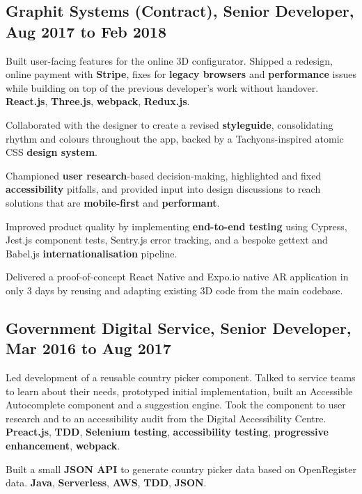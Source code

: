 \documentclass{article}
\begin{document}
\subsection*{Graphit Systems (Contract), Senior Developer, Aug 2017 to Feb 2018}

Built user-facing features for the online 3D configurator. Shipped a redesign,
online payment with \textbf{Stripe}, fixes for \textbf{legacy browsers} and
\textbf{performance} issues while building on top of the previous developer's
work without handover. \textbf{React.js}, \textbf{Three.js}, \textbf{webpack},
\textbf{Redux.js}.

Collaborated with the designer to create a revised \textbf{styleguide},
consolidating rhythm and colours throughout the app, backed by a
Tachyons-inspired atomic CSS \textbf{design system}.

Championed \textbf{user research}-based decision-making, highlighted and fixed
\textbf{accessibility} pitfalls, and provided input into design discussions to
reach solutions that are \textbf{mobile-first} and \textbf{performant}.

Improved product quality by implementing \textbf{end-to-end testing} using
Cypress, Jest.js component tests, Sentry.js error tracking, and a bespoke
gettext and Babel.js \textbf{internationalisation} pipeline.

Delivered a proof-of-concept React Native and Expo.io native AR application in
only 3 days by reusing and adapting existing 3D code from the main codebase.

\subsection*{Government Digital Service, Senior Developer, Mar 2016 to Aug 2017}

Led development of a reusable country picker component. Talked to service teams
to learn about their needs, prototyped initial implementation, built an
Accessible Autocomplete component and a suggestion engine. Took the component to
user research and to an accessibility audit from the Digital Accessibility
Centre. \textbf{Preact.js}, \textbf{TDD}, \textbf{Selenium testing},
\textbf{accessibility testing}, \textbf{progressive enhancement},
\textbf{webpack}.

Built a small \textbf{JSON API} to generate country picker data based on
OpenRegister data. \textbf{Java}, \textbf{Serverless}, \textbf{AWS},
\textbf{TDD}, \textbf{JSON}.
\end{document}
